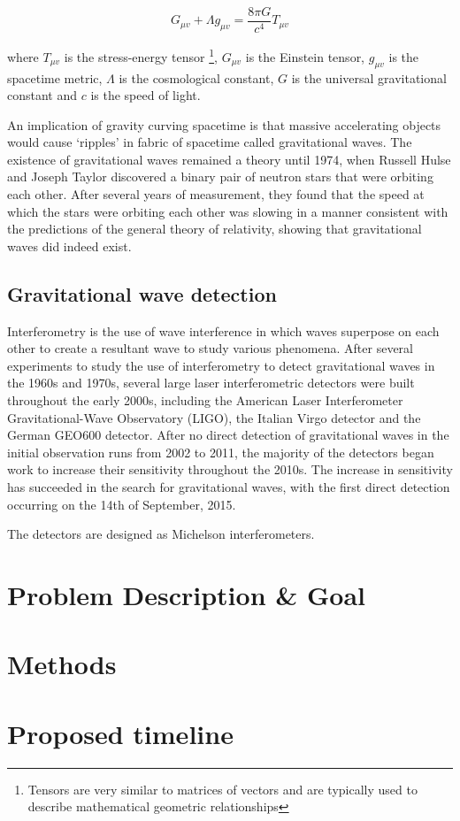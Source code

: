 \documentclass{article}
\begin{document}
\begin{equation}
    G_{\mu{}v} + \Lambda{}g_{\mu{}v} = \dfrac{8\pi{}G}{c^4}T_{\mu{}v}
\end{equation}

where \(T_{\mu{}v}\) is the stress-energy tensor \footnote{Tensors are very similar to matrices of vectors and are typically used to describe mathematical geometric relationships}, \(G_{\mu{}v}\) is the Einstein tensor, \(g_{\mu{}v}\) is the spacetime metric, \(\Lambda\) is the cosmological constant, \(G\) is the universal gravitational constant and \(c\) is the speed of light.

An implication of gravity curving spacetime is that massive accelerating objects would cause `ripples' in fabric of spacetime called gravitational waves. The existence of gravitational waves remained a theory until 1974, when Russell Hulse and Joseph Taylor discovered a binary pair of neutron stars that were orbiting each other. After several years of measurement, they found that the speed at which the stars were orbiting each other was slowing in a manner consistent with the predictions of the general theory of relativity, showing that gravitational waves did indeed exist.

\subsection{Gravitational wave detection}

Interferometry is the use of wave interference \textendash{} in which waves superpose on each other to create a resultant wave \textendash{} to study various phenomena. After several experiments to study the use of interferometry to detect gravitational waves in the 1960s and 1970s, several large laser interferometric detectors were built throughout the early 2000s, including the American Laser Interferometer Gravitational-Wave Observatory (LIGO), the Italian Virgo detector and the German GEO600 detector. After no direct detection of gravitational waves in the initial observation runs from 2002 to 2011, the majority of the detectors began work to increase their sensitivity throughout the 2010s. The increase in sensitivity has succeeded in the search for gravitational waves, with the first direct detection occurring on the 14th of September, 2015.

The detectors are designed as Michelson interferometers. 

\section{Problem Description \& Goal}
\section{Methods}
\section{Proposed timeline}
\end{document}
